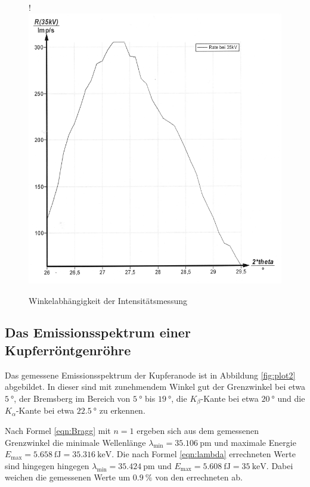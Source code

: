 \begin{figure}[H]!
  \centering
  \includegraphics[scale=0.3]{content/bild1.png}
  \caption{Winkelabhängigkeit der Intensitätsmessung}
  \label{fig:plot1}
\end{figure}

\subsection{Das Emissionsspektrum einer Kupferröntgenröhre}

Das gemessene Emissionsspektrum der Kupferanode ist in Abbildung \ref{fig:plot2} abgebildet.
In dieser sind mit zunehmendem Winkel gut der Grenzwinkel bei etwa $\SI{5}{\degree}$,
der Bremsberg im Bereich von $\SI{5}{\degree}$ bis $\SI{19}{\degree}$, die 
$K_\beta$-Kante bei etwa $\SI{20}{\degree}$ und die $K_\alpha$-Kante bei 
etwa $\SI{22.5}{\degree}$ zu erkennen. 

Nach Formel \eqref{eqn:Bragg} mit $n = 1$ ergeben sich aus dem gemessenen Grenzwinkel die 
minimale Wellenlänge $\lambda_\text{min} = \SI{35.106}{\pico\meter}$ und maximale
Energie $E_\text{max} = \SI{5.658}{\femto\joule} = \SI{35.316}{\kilo\eV}$.
Die nach Formel \eqref{eqn:lambda} errechneten Werte sind hingegen hingegen
$\lambda_\text{min} = \SI{35.424}{\pico\meter}$ und 
$E_\text{max} = \SI{5.608}{\femto\joule} = \SI{35}{\kilo\eV}$.
Dabei weichen die gemessenen Werte um $\SI{0.9}{\percent}$ von den errechneten ab.

